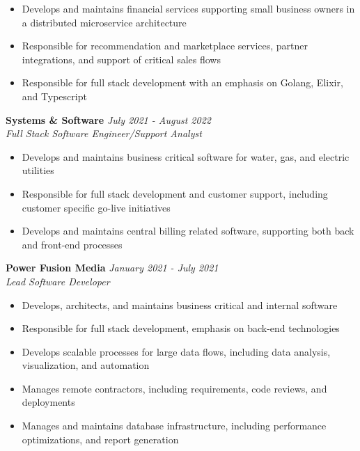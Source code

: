 \documentclass{res}
\begin{document}
\begin{resume}
			\begin{itemize} \itemsep -2pt
				\item Develops and maintains financial services supporting small business owners in a distributed microservice architecture
				\item Responsible for recommendation and marketplace services, partner integrations, and support of critical sales flows
				\item Responsible for full stack development with an emphasis on Golang, Elixir, and Typescript
			\end{itemize} \vspace{-2mm}
    		
    		{\bf Systems \& Software} \hfill \emph{July 2021 - August 2022} \\
			\emph{Full Stack Software Engineer/Support Analyst}

			\begin{itemize} \itemsep -2pt
				\item Develops and maintains business critical software for water, gas, and electric utilities
				\item Responsible for full stack development and customer support, including customer specific go-live initiatives
				\item Develops and maintains central billing related software, supporting both back and front-end processes
			\end{itemize} \vspace{-2mm}
			
	    {\bf Power Fusion Media} \hfill \emph{January 2021 - July 2021} \\
			\emph{Lead Software Developer}

			\begin{itemize} \itemsep -2pt
				\item Develops, architects, and maintains business critical and internal software
				\item Responsible for full stack development, emphasis on back-end technologies
				\item Develops scalable processes for large data flows, including data analysis, visualization, and automation
				\item Manages remote contractors, including requirements, code reviews, and deployments
                \item Manages and maintains database infrastructure, including performance optimizations, and report generation
			\end{itemize} \vspace{-2mm}
    

\end{resume}
\end{document}
